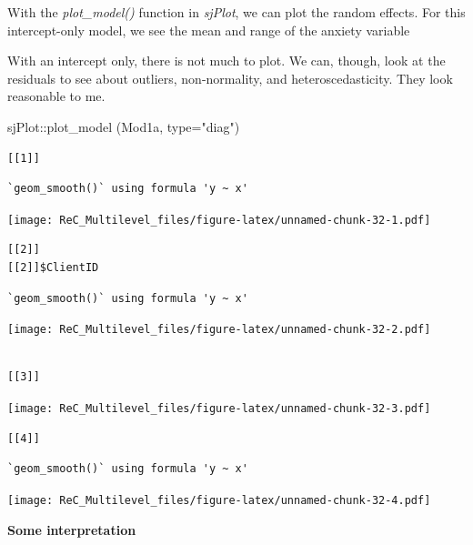 \documentclass[
  english,
]{book}
\newenvironment{Shaded}{\begin{snugshade}}{\end{snugshade}}
\newcommand{\AttributeTok}[1]{\textcolor[rgb]{0.77,0.63,0.00}{#1}}
\newcommand{\FunctionTok}[1]{\textcolor[rgb]{0.00,0.00,0.00}{#1}}
\newcommand{\NormalTok}[1]{#1}
\newcommand{\SpecialCharTok}[1]{\textcolor[rgb]{0.00,0.00,0.00}{#1}}
\newcommand{\StringTok}[1]{\textcolor[rgb]{0.31,0.60,0.02}{#1}}
\begin{document}
With the \emph{plot\_model()} function in \emph{sjPlot}, we can plot the random effects. For this intercept-only model, we see the mean and range of the anxiety variable

With an intercept only, there is not much to plot. We can, though, look at the residuals to see about outliers, non-normality, and heteroscedasticity. They look reasonable to me.

\begin{Shaded}
\begin{Highlighting}[]
\NormalTok{sjPlot}\SpecialCharTok{::}\FunctionTok{plot\_model}\NormalTok{ (Mod1a, }\AttributeTok{type=}\StringTok{"diag"}\NormalTok{)}
\end{Highlighting}
\end{Shaded}

\begin{verbatim}
[[1]]
\end{verbatim}

\begin{verbatim}
`geom_smooth()` using formula 'y ~ x'
\end{verbatim}

\texttt{[image: ReC\_Multilevel\_files/figure-latex/unnamed-chunk-32-1.pdf]}

\begin{verbatim}
[[2]]
[[2]]$ClientID
\end{verbatim}

\begin{verbatim}
`geom_smooth()` using formula 'y ~ x'
\end{verbatim}

\texttt{[image: ReC\_Multilevel\_files/figure-latex/unnamed-chunk-32-2.pdf]}

\begin{verbatim}

[[3]]
\end{verbatim}

\texttt{[image: ReC\_Multilevel\_files/figure-latex/unnamed-chunk-32-3.pdf]}

\begin{verbatim}
[[4]]
\end{verbatim}

\begin{verbatim}
`geom_smooth()` using formula 'y ~ x'
\end{verbatim}

\texttt{[image: ReC\_Multilevel\_files/figure-latex/unnamed-chunk-32-4.pdf]}

\textbf{Some interpretation}
\end{document}
